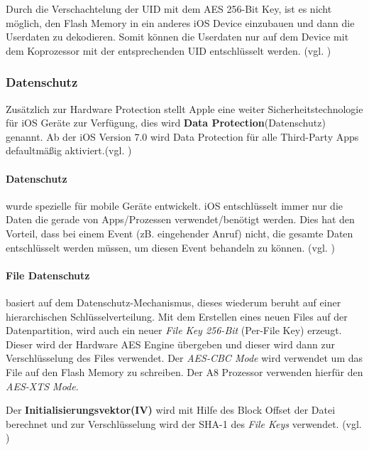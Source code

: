 Durch die Verschachtelung der UID mit dem AES 256-Bit Key, ist es nicht möglich, den Flash Memory in ein anderes iOS Device einzubauen und dann die Userdaten zu dekodieren. Somit können die Userdaten nur auf dem Device mit dem Koprozessor mit der entsprechenden UID entschlüsselt werden. (vgl. \cite{iOSSec[5], iOSSec[2],iOSSec[1], Apple[4], Apple[5], Apple[6], Apple[3]})

\subsubsection{Datenschutz}
\label{sec:DataProtection}

Zusätzlich zur Hardware Protection stellt Apple eine weiter Sicherheitstechnologie für iOS Geräte zur Verfügung, dies wird \textbf{Data Protection}(Datenschutz) genannt. Ab der iOS Version 7.0 wird Data Protection für alle Third-Party Apps defaultmäßig aktiviert.(vgl. \cite{iOSSec[5], iOSSec[2],iOSSec[1], Apple[4], Apple[5], Apple[6], Apple[3]})

\paragraph{Datenschutz} wurde spezielle für mobile Geräte entwickelt. iOS entschlüsselt immer nur die Daten die gerade von Apps/Prozessen verwendet/benötigt werden. Dies hat den Vorteil, dass bei einem Event (zB. eingehender Anruf) nicht, die gesamte Daten entschlüsselt werden müssen, um diesen Event behandeln zu können. (vgl. \cite{Apple[4]})

\paragraph{File Datenschutz} basiert auf dem Datenschutz-Mechanismus, dieses wiederum beruht auf einer hierarchischen Schlüsselverteilung. Mit dem Erstellen eines neuen Files auf der Datenpartition, wird auch ein neuer \textit{\glqq File Key 256-Bit\grqq{}} (\glqq Per-File Key\grqq) erzeugt. Dieser wird der Hardware AES Engine übergeben und dieser wird dann zur Verschlüsselung des Files verwendet.  Der \textit{\glqq AES-CBC Mode\grqq{}} wird verwendet um das File auf den Flash Memory zu schreiben. Der A8 Prozessor verwenden hierfür den \textit{\glqq AES-XTS Mode\grqq{}}.  \par
Der \textbf{Initialisierungsvektor(IV)} wird mit Hilfe des Block Offset der Datei berechnet und zur Verschlüsselung wird der SHA-1 des \textit{\glqq File Keys\grqq{}} verwendet. (vgl. \cite{iOSSec[5], iOSSec[2],iOSSec[1], Apple[4], Apple[5], Apple[6], Apple[3]})

